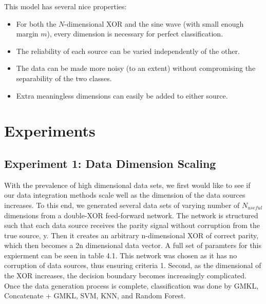\documentclass{article}
\begin{document}
This model has several nice properties:
\begin{itemize}
    \item For both the $N$-dimensional XOR and the sine wave (with small enough
        margin $m$), every dimension is necessary for perfect classification.
    \item The reliability of each source can be varied independently of the
        other.
    \item The data can be made more noisy (to an extent) without
        compromising the separability of the two classes.
    \item Extra meaningless dimensions can easily be added to either source.
\end{itemize}




\section*{Experiments}

\subsection*{Experiment 1: Data Dimension Scaling}
With the prevalence of high dimensional data sets, we first would like to see
if our data integration methods scale well as the dimension of the data sources
increases. To this end, we generated several data sets of varying number of
$N_{useful}$ dimensions from a double-XOR feed-forward network. The network is
structured such that each data source receives the parity signal without
corruption from the true source, y. Then it creates an arbitrary n-dimensional
XOR of correct parity, which then becomes a 2n dimensional data vector.  A full
set of paramters for this expierment can be seen in table 4.1. This network was
chosen as it has no corruption of data sources, thus ensuring criteria 1.
Second, as the dimensional of the XOR increases, the decision boundary becomes
increasingly complicated. Once the data generation process is complete,
classification was done by GMKL, Concatenate + GMKL, SVM, KNN, and Random
Forest.
\end{document}

